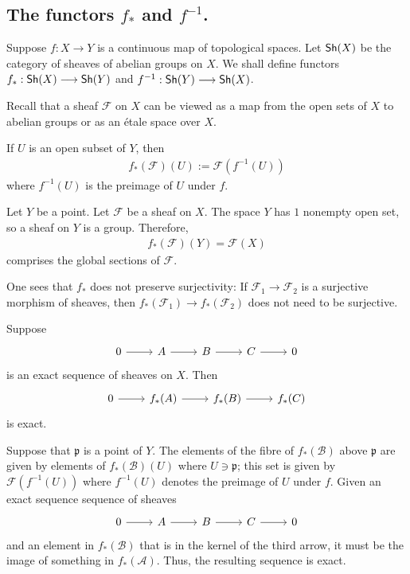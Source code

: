 \documentclass [11 pt, oneside] {article}
\begin{document}
\subsection{The functors \texorpdfstring{$f_*$}{f*} and \texorpdfstring{$f^{-1}$}{f-1}.}\label{functorsp_1}
Suppose $f:X\longrightarrow Y$ is a continuous map of topological spaces. Let $\textsf{Sh}(X)$ be the category of sheaves of abelian groups on $X$. We shall define functors $f_* : \textsf{Sh}(X) \longrightarrow \textsf{Sh}(Y)$ and $f^{-1} : \textsf{Sh}(Y) \longrightarrow \textsf{Sh}(X)$.

Recall that a sheaf $\mathscr{F}$ on $X$ can be viewed as a map from the open sets of $X$ to abelian groups or as an \'etale space over $X$.

If $U$ is an open subset of $Y$, then
\begin{align*}
	f_*(\mathscr{F}) (U) :=  \mathscr{F}(f^{-1}(U))
\end{align*}
where $f^{-1}(U)$ is the preimage of $U$ under $f$.

\begin{example}[ ]\label{}\text{}
Let $Y$ be a point. Let $\mathscr{F}$ be a sheaf on $X$. The space $Y$ has $1$ nonempty open set, so a sheaf on $Y$ is a group. Therefore,
\begin{align*}
	f_*(\mathscr{F}) (Y) =  \mathscr{F}(X)
\end{align*}
comprises the global sections of $\mathscr{F}$.
\end{example}

One sees that $f_*$ does not preserve surjectivity: If $\mathscr{F}_1\longrightarrow \mathscr{F}_2$ is a surjective morphism of sheaves, then $f_*(\mathscr{F}_1)\longrightarrow f_*(\mathscr{F}_2)$ does not need to be surjective.

Suppose
\[
\begin{tikzcd}
	0 \ar[r] &\mathscr{A} \ar[r] &\mathscr{B} \ar[r] &\mathscr{C}\ar[r]&0
\end{tikzcd}
\]
is an exact sequence of sheaves on $X$. Then
\[
\begin{tikzcd}
	0 \ar[r]&f_*(\mathscr{A}) \ar[r] &f_*(\mathscr{B}) \ar[r] &f_*(\mathscr{C})
\end{tikzcd}
\]
is exact. 

Suppose that $\mathfrak p$ is a point of $Y$. The elements of the fibre of $f_*(\mathscr{B})$ above $\mathfrak p$ are given by elements of $f_*(\mathscr{B})(U)$ where $U\ni \mathfrak p$; this set is given by $\mathscr{F}(f^{-1}(U))$ where $f^{-1}(U)$ denotes the preimage of $U$ under $f$. Given an exact sequence sequence of sheaves
\[
\begin{tikzcd}
	 0 \ar[r] &\mathscr{A} \ar[r] &\mathscr{B} \ar[r] &\mathscr{C}\ar[r]&0
\end{tikzcd}
\]
and an element in $f_*(\mathscr{B})$ that is in the kernel of the third arrow, it must be the image of something in $f_*(\mathscr{A})$. Thus, the resulting sequence is exact.
\end{document}
